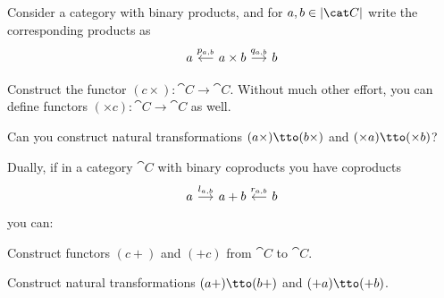 \begin{exercise}
Consider a category with binary products, and for \(a, b \in \obj{\cat C}\) write the corresponding products as
\[\begin{tikzcd}[column sep=small]
a & a \times b \ar["{p_{a,b}}", l, swap] \ar["{q_{a,b}}", r] & b
\end{tikzcd}\]
\begin{tcbenum}
\item Construct the functor \((c \times) : \cat C \to \cat C\). Without much other effort, you can define functors \((\times c) : \cat C \to \cat C\) as well.
\item Can you construct natural transformations \((a \times) \tto (b \times)\) and \((\times a) \tto (\times b)\)?
\end{tcbenum}
Dually, if in a category \(\cat C\) with binary coproducts you have coproducts
\[\begin{tikzcd}[column sep=small]
a \ar["{l_{a,b}}", r] & a+b & b \ar["{r_{a,b}}", l, swap]
\end{tikzcd}\]
you can:
\begin{tcbenum}
\item Construct functors \((c +)\) and \((+ c)\) from \(\cat C\) to \(\cat C\).
\item Construct natural transformations \((a +) \tto (b +)\) and \((+ a) \tto (+ b)\).
\end{tcbenum}
\end{exercise}

